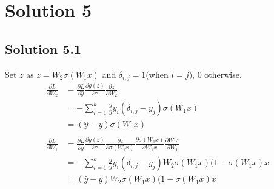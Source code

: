 \documentclass[a4paper]{article}
\theoremstyle{definition}
\newenvironment{soln}{
	\leavevmode\color{blue}\ignorespaces
}{}
\begin{document}
	
	\section*{Solution 5}
	\subsection*{Solution 5.1}	
	\begin{soln}
	Set $z$ as $z = W_2 \sigma(W_1 x)$ and $\delta_{i,j} = 1 ($when $i=j)$, $0$ otherwise.
		\begin{equation*}\label{xx}
			\begin{split}
\frac{\partial L}{\partial W_2} &= \frac{\partial L}{\partial \hat{y}} \frac{\partial g(z)}{\partial z} \frac{\partial z}{\partial W_2} \\
				&= - \sum^{k}_{i=1} \frac{y}{\hat{y}} y_i (\delta_{i,j} - y_j) \sigma(W_1 x ) \\
				&= (\hat{y} - y) \sigma(W_1 x ) \\
				\\
\frac{\partial L}{\partial W_1} &= \frac{\partial L}{\partial \hat{y}} \frac{\partial g(z)}{\partial z} \frac{\partial z}{\partial \sigma(W_1 x)} \frac{\partial \sigma(W_1 x)}{\partial W_1 x} \frac{\partial W_1 x}{\partial W_1}   \\
				&= - \sum^{k}_{i=1} \frac{y}{\hat{y}} y_i (\delta_{i,j} - y_j) W_2 \sigma(W_1 x) (1-\sigma(W_1 x) x \\
				&= (\hat{y} - y) W_2 \sigma(W_1 x) (1-\sigma(W_1 x) x \\
			\end{split}
		\end{equation*}	
		
	\end{soln}
	
	\clearpage
	
\end{document}
